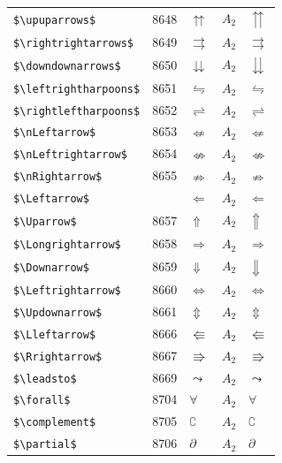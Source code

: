 ﻿\documentclass{article}
\begin{document}
\begin{table}
\begin{center}
\begin{tabular}{llll}
 \verb#$\upuparrows$#          & 8648    & $\upuparrows$          & $A_2\quad \upuparrows$\\
 \verb#$\rightrightarrows$#    & 8649    & $\rightrightarrows$    & $A_2\quad \rightrightarrows$\\
 \verb#$\downdownarrows$#      & 8650    & $\downdownarrows$      & $A_2\quad \downdownarrows$\\
 \verb#$\leftrightharpoons$#   & 8651    & $\leftrightharpoons$   & $A_2\quad \leftrightharpoons$\\
 \verb#$\rightleftharpoons$#   & 8652    & $\rightleftharpoons$   & $A_2\quad \rightleftharpoons$\\
 \verb#$\nLeftarrow$#          & 8653    & $\nLeftarrow$          & $A_2\quad \nLeftarrow$\\
 \verb#$\nLeftrightarrow$#     & 8654    & $\nLeftrightarrow$     & $A_2\quad \nLeftrightarrow$\\
 \verb#$\nRightarrow$#         & 8655    & $\nRightarrow$         & $A_2\quad \nRightarrow$\\
 \verb#$\Leftarrow$#           &         & $\Leftarrow$           & $A_2\quad \Leftarrow$\\
 \verb#$\Uparrow$#             & 8657    & $\Uparrow$             & $A_2\quad \Uparrow$\\
 \verb#$\Longrightarrow$#      & 8658    & $\Longrightarrow$      & $A_2\quad \Longrightarrow$\\
 \verb#$\Downarrow$#           & 8659    & $\Downarrow$           & $A_2\quad \Downarrow$\\
 \verb#$\Leftrightarrow$#      & 8660    & $\Leftrightarrow$      & $A_2\quad \Leftrightarrow$\\
 \verb#$\Updownarrow$#         & 8661    & $\Updownarrow$         & $A_2\quad \Updownarrow$\\
 \verb#$\Lleftarrow$#          & 8666    & $\Lleftarrow$          & $A_2\quad \Lleftarrow$\\
 \verb#$\Rrightarrow$#         & 8667    & $\Rrightarrow$         & $A_2\quad \Rrightarrow$\\
 \verb#$\leadsto$#             & 8669    & $\leadsto$             & $A_2\quad \leadsto$\\
 \verb#$\forall$#              & 8704    & $\forall$              & $A_2\quad \forall$\\
 \verb#$\complement$#          & 8705    & $\complement$          & $A_2\quad \complement$\\
 \verb#$\partial$#             & 8706    & $\partial$             & $A_2\quad \partial$\\

\end{tabular}
\end{center}
\end{table}
\end{document}
